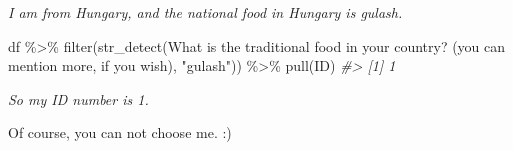 \documentclass[
]{article}
\newenvironment{Shaded}{\begin{snugshade}}{\end{snugshade}}
\newcommand{\AttributeTok}[1]{\textcolor[rgb]{0.77,0.63,0.00}{#1}}
\newcommand{\CommentTok}[1]{\textcolor[rgb]{0.56,0.35,0.01}{\textit{#1}}}
\newcommand{\FunctionTok}[1]{\textcolor[rgb]{0.00,0.00,0.00}{#1}}
\newcommand{\NormalTok}[1]{#1}
\newcommand{\SpecialCharTok}[1]{\textcolor[rgb]{0.00,0.00,0.00}{#1}}
\newcommand{\StringTok}[1]{\textcolor[rgb]{0.31,0.60,0.02}{#1}}
\begin{document}
\emph{I am from Hungary, and the national food in Hungary is gulash.}

\begin{Shaded}
\begin{Highlighting}[]
\NormalTok{df }\SpecialCharTok{\%\textgreater{}\%} 
  \FunctionTok{filter}\NormalTok{(}\FunctionTok{str\_detect}\NormalTok{(}\StringTok{\textasciigrave{}}\AttributeTok{What is the traditional food in your country? (you can mention more, if you wish)}\StringTok{\textasciigrave{}}\NormalTok{, }\StringTok{"gulash"}\NormalTok{)) }\SpecialCharTok{\%\textgreater{}\%} 
  \FunctionTok{pull}\NormalTok{(ID)}
\CommentTok{\#\textgreater{} [1] 1}
\end{Highlighting}
\end{Shaded}

\emph{So my ID number is 1.}

Of course, you can not choose me. :)

  
\end{document}
